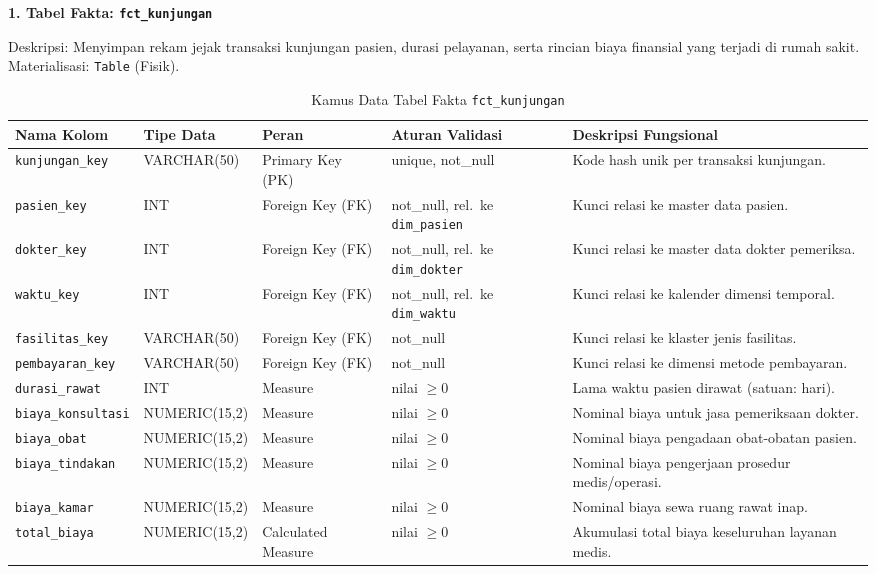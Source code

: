 \textbf{1. Tabel Fakta: \texttt{fct\_kunjungan}}
 
Deskripsi: Menyimpan rekam jejak transaksi kunjungan pasien, durasi pelayanan, serta rincian biaya finansial yang terjadi di rumah sakit. Materialisasi: \texttt{Table} (Fisik).
 
\begin{table}[H]
\centering
\caption{Kamus Data Tabel Fakta \texttt{fct\_kunjungan}}
\small
\begin{tabularx}{\linewidth}{p{3cm}p{2.2cm}p{2.4cm}p{3cm}X}
\toprule
\textbf{Nama Kolom} & \textbf{Tipe Data} & \textbf{Peran} & \textbf{Aturan Validasi} & \textbf{Deskripsi Fungsional} \\
\midrule
\texttt{kunjungan\_key}   & VARCHAR(50)   & Primary Key (PK)   & unique, not\_null                           & Kode hash unik per transaksi kunjungan. \\
\texttt{pasien\_key}      & INT           & Foreign Key (FK)   & not\_null, rel.\ ke \texttt{dim\_pasien}    & Kunci relasi ke master data pasien. \\
\texttt{dokter\_key}      & INT           & Foreign Key (FK)   & not\_null, rel.\ ke \texttt{dim\_dokter}    & Kunci relasi ke master data dokter pemeriksa. \\
\texttt{waktu\_key}       & INT           & Foreign Key (FK)   & not\_null, rel.\ ke \texttt{dim\_waktu}     & Kunci relasi ke kalender dimensi temporal. \\
\texttt{fasilitas\_key}   & VARCHAR(50)   & Foreign Key (FK)   & not\_null                                   & Kunci relasi ke klaster jenis fasilitas. \\
\texttt{pembayaran\_key}  & VARCHAR(50)   & Foreign Key (FK)   & not\_null                                   & Kunci relasi ke dimensi metode pembayaran. \\
\texttt{durasi\_rawat}    & INT           & Measure            & nilai $\geq 0$                              & Lama waktu pasien dirawat (satuan: hari). \\
\texttt{biaya\_konsultasi}& NUMERIC(15,2) & Measure            & nilai $\geq 0$                              & Nominal biaya untuk jasa pemeriksaan dokter. \\
\texttt{biaya\_obat}      & NUMERIC(15,2) & Measure            & nilai $\geq 0$                              & Nominal biaya pengadaan obat-obatan pasien. \\
\texttt{biaya\_tindakan}  & NUMERIC(15,2) & Measure            & nilai $\geq 0$                              & Nominal biaya pengerjaan prosedur medis/operasi. \\
\texttt{biaya\_kamar}     & NUMERIC(15,2) & Measure            & nilai $\geq 0$                              & Nominal biaya sewa ruang rawat inap. \\
\texttt{total\_biaya}     & NUMERIC(15,2) & Calculated Measure & nilai $\geq 0$                              & Akumulasi total biaya keseluruhan layanan medis. \\
\bottomrule
\end{tabularx}
\end{table}
 
